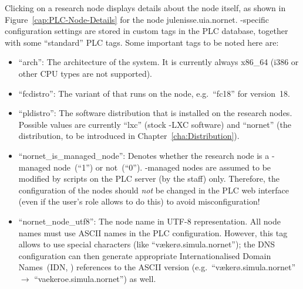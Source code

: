 Clicking on a research node displays details about the node itself, as shown in Figure~\ref{cap:PLC-Node-Details} for the node julenisse.uia.nornet. -specific configuration settings are stored in custom tags in the PLC database, together with some ``standard'' PLC tags. Some important tags to be noted here are:
\begin{itemize}
 \item ``arch'': The architecture of the system. It is currently always x86\_64 (i386 or other CPU types are not supported).

 \item ``fcdistro'': The variant of  that runs on the node, e.g.\ ``fc18'' for version~18.

 \item ``pldistro'': The software distribution that is installed on the research nodes. Possible values are currently ``lxc'' (stock -LXC software) and ``nornet'' (the  distribution, to be introduced in Chapter~\ref{cha:Distribution}).
 
 \item ``nornet\_is\_managed\_node'': Denotes whether the research node is a -managed node~(``1'') or not~(``0''). -managed nodes are assumed to be modified by scripts on the PLC server (by the  staff) only. Therefore, the configuration of the nodes should \emph{not} be changed in the PLC web interface (even if the user's role allows to do this) to avoid misconfiguration!

 \item ``nornet\_node\_utf8'': The node name in UTF-8 representation. All node names must use ASCII names in the PLC configuration. However, this tag allows to use special characters (like ``vækerø.simula.nornet''); the DNS configuration can then generate appropriate Internationalised Domain Names~(IDN, \cite{RFC3492}) references to the ASCII version (e.g.\ ``vækerø.simula.nornet'' $\rightarrow$ ``vaekeroe.simula.nornet'') as well.
 

\end{itemize}
